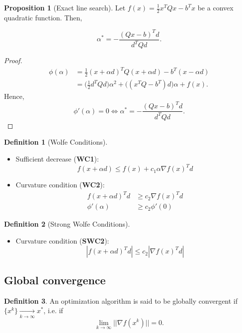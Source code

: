 \documentclass[a4paper, 10pt, twocolumn]{article}
\theoremstyle{definition}
\newtheorem*{defn}{Definition}
\newtheorem{prop}[theorem]{Proposition}
\theoremstyle{remark}
\newcommand{\al}{\alpha}
\begin{document}
\begin{prop}[Exact line search]
Let $f(x) = \frac{1}{2}x^TQx - b^Tx$ be a convex quadratic function. Then, 

$$
\al^* = -\frac{(Qx-b)^Td}{d^TQd}.
$$

\begin{proof}
\begin{align*}
\phi(\al) &= \frac{1}{2}(x+\al d)^TQ(x+\al d) - b^T(x-\al d)\\
&= \bigg(\frac{1}{2}d^TQd\bigg)\al^2 + \bigg((x^TQ-b^T)d\bigg)\al + f(x).
\end{align*}
Hence,
$$
\phi'(\al) = 0 \Leftrightarrow \al^* = -\frac{(Qx-b)^Td}{d^TQd}.
$$
\end{proof}
\end{prop}

\begin{defn}[Wolfe Conditions]
\
\begin{itemize}
\item Sufficient decrease (\textbf{WC1}):
\vspace{5pt}
$$
f(x +\al d) \leq f(x) + c_1\al\nabla f(x)^Td
$$
\item Curvature condition (\textbf{WC2}):
\vspace{5pt}
\begin{align*}
f(x+\al d)^Td &\geq c_2\nabla f(x)^Td \\
\phi'(\al) &\geq c_2\phi'(0)
\end{align*}
\end{itemize}
\end{defn}

\begin{defn}[Strong Wolfe Conditions]
\
\begin{itemize}
\item Curvature condition (\textbf{SWC2}):
\vspace{5pt}
$$
| f(x+\al d)^Td | \leq c_2| \nabla f(x)^Td |
$$
\end{itemize}
\end{defn}


\subsection{Global convergence}

\begin{defn}
An optimization algorithm is said to be globally convergent if $\{x^k\} \underset{k\rightarrow\infty}{\longrightarrow}x^*$, i.e. if
\vspace{5pt}
$$
\lim_{k\rightarrow\infty}||\nabla f(x^k)|| = 0.
$$
\end{defn}
\end{document}
